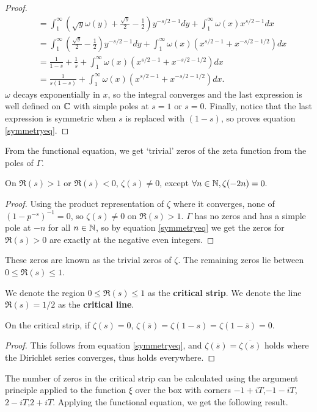 \begin{proof}
\begin{align*}
		&=\int_{1}^{\infty}\left(
		\sqrt{y}\omega(y) +\frac{\sqrt{y}}{2} - \frac{1}{2}
		\right) y^{-s/2-1} dy +
		\int_{1}^{\infty}\omega(x)  x^{s/2-1} dx\\
		&= \int_{1}^{\infty}\left(
			\frac{\sqrt{y}}{2} - \frac{1}{2}
			\right) y^{-s/2-1} dy+ \int_{1}^{\infty}\omega(x)  \left(x^{s/2-1} + x^{-s/2-1/2}\right)dx\\
		&= \frac{1}{1-s} + \frac{1}{s}+  \int_{1}^{\infty}\omega(x)  \left(x^{s/2-1} + x^{-s/2-1/2}\right)dx\\
		&= \frac{1}{s(1-s)}+ \int_{1}^{\infty}\omega(x)  \left(x^{s/2-1} + x^{-s/2-1/2}\right)dx.
	\end{align*}
	$\omega$ decays exponentially in $x$, so the integral converges and the last expression is well defined on $\mathbb{C}$ with simple poles at $s=1$ or $s=0$.
	Finally, notice that the last expression is symmetric when $s$ is replaced with $(1-s)$, so proves equation \ref{symmetryeq}.
\end{proof}
From the functional equation, we get `trivial' zeros of the zeta function from the poles of $\Gamma$. 

\begin{corollary}
	On $\Re(s)>1$ or $\Re(s)<0$, $\zeta(s)\neq 0$, except $\forall n\in\mathbb{N}, \zeta(-2n)=0.$
\end{corollary}
\begin{proof}
	Using the product representation of $\zeta$ where it converges, none of $(1-p^{-s})^{-1} =0$, so $\zeta(s)\neq 0$ on $\Re(s)>1$.
	$\Gamma$ has no zeros and has a simple pole at $-n$ for all $n\in\mathbb{N}$, so by equation \ref{symmetryeq} we get the zeros for $\Re(s)>0$ are exactly at the negative even integers.
\end{proof}
These zeros are known as the trivial zeros of $\zeta$. The remaining zeros lie between $0\leq \Re(s) \leq 1$.
\begin{definition}
	We denote the region $0\leq \Re(s) \leq 1$ as the \textbf{critical strip}. We denote the line $\Re(s) = 1/2$ as the \textbf{critical line}.
\end{definition}

\begin{corollary}
	On the critical strip, if $\zeta(s)=0$, $\zeta(\overline{s})=\zeta(1-s)=\zeta(1-\overline{s})=0.$
\end{corollary}
\begin{proof}
	This follows from equation \ref{symmetryeq}, and $\zeta(\overline{s})=\overline{\zeta(s)}$ holds where the Dirichlet series converges, thus holds everywhere.
\end{proof}
The number of zeros in the critical strip can be calculated using the argument principle applied to the function $\xi$ over the box with corners $-1+iT$,$-1-iT$,$2-iT$,$2+iT$.
Applying the functional equation, we get the following result.

